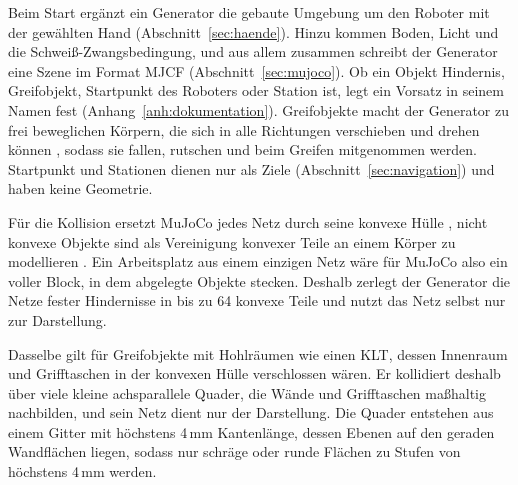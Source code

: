 Beim Start ergänzt ein Generator die gebaute Umgebung um den Roboter mit der gewählten Hand (Abschnitt~\ref{sec:haende}).
Hinzu kommen Boden, Licht und die Schweiß-Zwangsbedingung, und aus allem zusammen schreibt der Generator eine Szene im Format MJCF (Abschnitt~\ref{sec:mujoco}).
Ob ein Objekt Hindernis, Greifobjekt, Startpunkt des Roboters oder Station ist, legt ein Vorsatz in seinem Namen fest (Anhang~\ref{anh:dokumentation}).
Greifobjekte macht der Generator zu frei beweglichen Körpern, die sich in alle Richtungen verschieben und drehen können \cite{Todorov2012}, sodass sie fallen, rutschen und beim Greifen mitgenommen werden.
Startpunkt und Stationen dienen nur als Ziele (Abschnitt~\ref{sec:navigation}) und haben keine Geometrie.

Für die Kollision ersetzt MuJoCo jedes Netz durch seine konvexe Hülle \cite{MujocoDoku2026}, nicht konvexe Objekte sind als Vereinigung konvexer Teile an einem Körper zu modellieren \cite{MujocoDoku2026}.
Ein Arbeitsplatz aus einem einzigen Netz wäre für MuJoCo also ein voller Block, in dem abgelegte Objekte stecken.
Deshalb zerlegt der Generator die Netze fester Hindernisse in bis zu 64 konvexe Teile  und nutzt das Netz selbst nur zur Darstellung.

Dasselbe gilt für Greifobjekte mit Hohlräumen wie einen \ac{KLT}, dessen Innenraum und Grifftaschen in der konvexen Hülle verschlossen wären.
Er kollidiert deshalb über viele kleine achsparallele Quader, die Wände und Grifftaschen maßhaltig nachbilden, und sein Netz dient nur der Darstellung.
Die Quader entstehen aus einem Gitter mit höchstens 4\,mm Kantenlänge, dessen Ebenen auf den geraden Wandflächen liegen, sodass nur schräge oder runde Flächen zu Stufen von höchstens 4\,mm werden.

